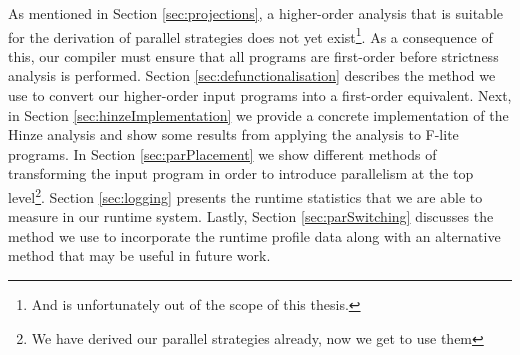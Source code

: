 As mentioned in Section \ref{sec:projections}, a higher-order analysis that is
suitable for the derivation of parallel strategies does not yet exist\footnote{
And is unfortunately out of the scope of this thesis.}. As a consequence of
this, our compiler must ensure that all programs are first-order before
strictness analysis is performed. Section \ref{sec:defunctionalisation}
describes the method we use to convert our higher-order input programs into a
first-order equivalent. Next, in Section \ref{sec:hinzeImplementation} we
provide a concrete implementation of the Hinze analysis and show some results
from applying the analysis to F-lite programs.  In Section
\ref{sec:parPlacement} we show different methods of transforming the input
program in order to introduce parallelism at the top level\footnote{We have
derived our parallel strategies already, now we get to use them}. Section
\ref{sec:logging} presents the runtime statistics that we are able to measure
in our runtime system. Lastly, Section \ref{sec:parSwitching} discusses the
method we use to incorporate the runtime profile data along with an alternative
method that may be useful in future work. 
